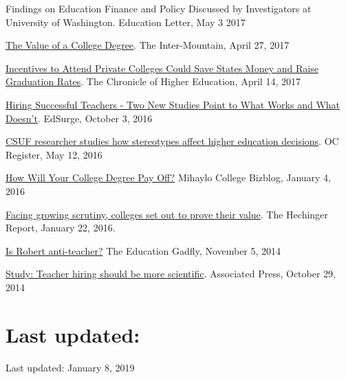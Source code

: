 \documentclass[11pt,a4paper,serif]{moderncv}
\begin{document}
\begin{hangparas}{.25in}{1}
Findings on Education Finance and Policy Discussed by Investigators at University of Washington. Education Letter, May 3 2017



\href{http://www.theintermountain.com/opinion/columnists/2017/04/the-value-of-a-college-degree/}{The Value of a College Degree}. The Inter-Mountain, April 27, 2017



\href{http://www.chronicle.com/article/Incentives-to-Attend-Private/239801?cid=at\&utm_source=at\&utm_medium=en\&elqTrackId=5719cd9ce29549cf9b399520678c52f0\&elq=c46d8f380cc14466861c12899b770d6c\&elqaid=13488\&elqat=1\&elqCampaignId=5599}{Incentives to Attend Private Colleges Could Save States Money and Raise Graduation Rates}. The Chronicle of Higher Education, April 14, 2017



\href{https://www.edsurge.com/news/2016-10-03-hiring-successful-teachers-two-new-studies-point-to-what-works-and-what-doesn-t}{Hiring Successful Teachers - Two New Studies Point to What Works and What Doesn't}. EdSurge, October 3, 2016



\href{http://www.ocregister.com/articles/college-715504-students-klein.html}{CSUF researcher studies how stereotypes affect higher education decisions}. OC Register, May 12, 2016



\href{https://bizblogs.fullerton.edu/blog/2016/01/04/how-will-your-college-degree-pay-off/}{How Will Your College Degree Pay Off?} Mihaylo College Bizblog, January 4, 2016



\href{http://hechingerreport.org/25399-2/}{Facing growing scrutiny, colleges set out to prove their value}. The Hechinger Report, January 22, 2016.



\href{https://edexcellence.net/commentary/podcasts/is-robert-anti-teacher}{Is Robert anti-teacher?} The Education Gadfly, November 5, 2014



\href{http://komonews.com/news/local/study-teacher-hiring-should-be-more-scientific}{Study: Teacher hiring should be more scientific}. Associated Press, October 29, 2014

 
 \end{hangparas}


\section{Last updated:}  
  
Last updated: January 8, 2019

\end{document}
